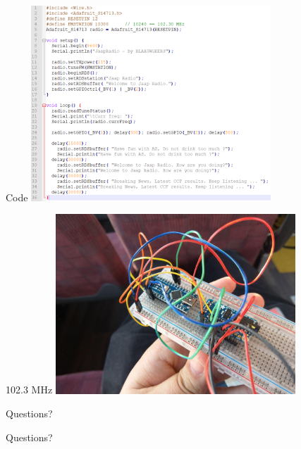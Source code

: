 \documentclass[10pt]{beamer}
\begin{document}
\begin{frame}{Code}
    \includegraphics[width=9cm]{FMcode.png}
\end{frame}

\begin{frame}{102.3 MHz}
    \includegraphics[width=9cm]{photo_2018-04-20_10-12-16.jpg}
\end{frame}



\begin{frame}{Questions?}

Questions?

%
%
\end{frame}
\end{document}
